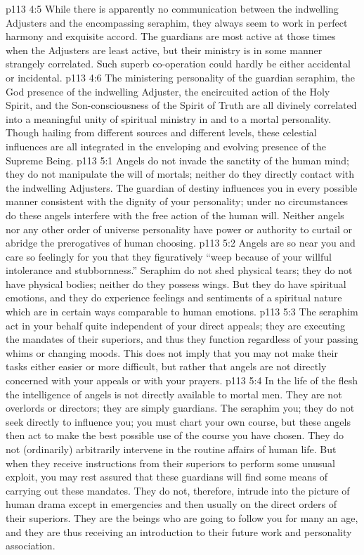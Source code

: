 \vs p113 4:5 While there is apparently no communication between the indwelling Adjusters and the encompassing seraphim, they always seem to work in perfect harmony and exquisite accord. The guardians are most active at those times when the Adjusters are least active, but their ministry is in some manner strangely correlated. Such superb co\hyp{}operation could hardly be either accidental or incidental.
\vs p113 4:6 The ministering personality of the guardian seraphim, the God presence of the indwelling Adjuster, the encircuited action of the Holy Spirit, and the Son\hyp{}consciousness of the Spirit of Truth are all divinely correlated into a meaningful unity of spiritual ministry in and to a mortal personality. Though hailing from different sources and different levels, these celestial influences are all integrated in the enveloping and evolving presence of the Supreme Being.
\vs p113 5:1 Angels do not invade the sanctity of the human mind; they do not manipulate the will of mortals; neither do they directly contact with the indwelling Adjusters. The guardian of destiny influences you in every possible manner consistent with the dignity of your personality; under no circumstances do these angels interfere with the free action of the human will. Neither angels nor any other order of universe personality have power or authority to curtail or abridge the prerogatives of human choosing.
\vs p113 5:2 Angels are so near you and care so feelingly for you that they figuratively “weep because of your willful intolerance and stubbornness.” Seraphim do not shed physical tears; they do not have physical bodies; neither do they possess wings. But they do have spiritual emotions, and they do experience feelings and sentiments of a spiritual nature which are in certain ways comparable to human emotions.
\vs p113 5:3 The seraphim act in your behalf quite independent of your direct appeals; they are executing the mandates of their superiors, and thus they function regardless of your passing whims or changing moods. This does not imply that you may not make their tasks either easier or more difficult, but rather that angels are not directly concerned with your appeals or with your prayers.
\vs p113 5:4 In the life of the flesh the intelligence of angels is not directly available to mortal men. They are not overlords or directors; they are simply guardians. The seraphim  you; they do not seek directly to influence you; you must chart your own course, but these angels then act to make the best possible use of the course you have chosen. They do not (ordinarily) arbitrarily intervene in the routine affairs of human life. But when they receive instructions from their superiors to perform some unusual exploit, you may rest assured that these guardians will find some means of carrying out these mandates. They do not, therefore, intrude into the picture of human drama except in emergencies and then usually on the direct orders of their superiors. They are the beings who are going to follow you for many an age, and they are thus receiving an introduction to their future work and personality association.\plusone
